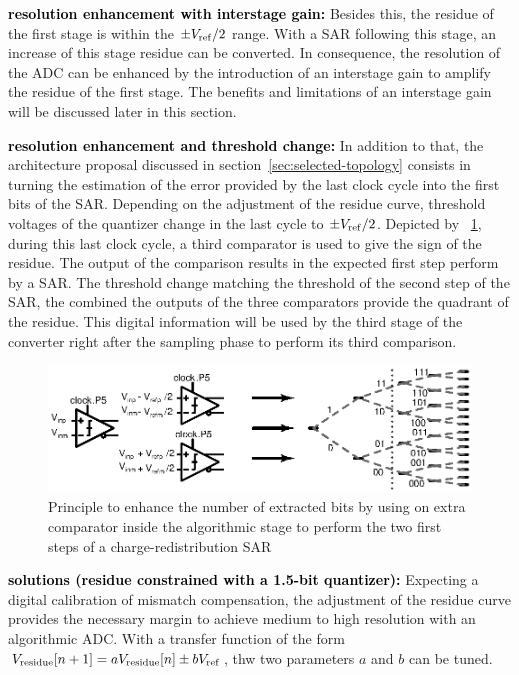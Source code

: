 \textbf{\textcolor{black}{resolution enhancement with interstage gain:}}
Besides this, the residue of the first stage is within the $\pm V_{\rm ref}/2$ range. With a SAR following this stage, an increase of this stage residue can be converted. In consequence, the resolution of the ADC can be enhanced by the introduction of an interstage gain to amplify the residue of the first stage. The benefits and limitations of an interstage gain will be discussed later in this section.

\textbf{\textcolor{black}{resolution enhancement and threshold change:}}
In addition to that, the architecture proposal discussed in section~\ref{sec:selected-topology} consists in turning the estimation of the error provided by the last clock cycle into the first bits of the SAR. Depending on the adjustment of the residue curve, threshold voltages of the quantizer change in the last cycle to \(\pm V_{\rm ref}/2\). Depicted by \figurename~\ref{fig:sar-first-bits-from-algo}, during this last clock cycle, a third comparator is used to give the sign of the residue. The output of the comparison results in the expected first step perform by a SAR\@. The threshold change matching the threshold of the second step of the SAR, the combined the outputs of the three comparators provide the quadrant of the residue. This digital information will be used by the third stage of the converter right after the sampling phase to perform its third comparison.

\begin{figure}[htp]
	\centering
	\includegraphics[width=\textwidth]{Chapter4/Figs/algo_sar_first_bits.ps}
	\caption{Principle to enhance the number of extracted bits by using on extra comparator inside the algorithmic stage to perform the two first steps of a charge-redistribution SAR}
	\label{fig:sar-first-bits-from-algo}
\end{figure}

\textbf{\textcolor{black}{solutions (residue constrained with a 1.5-bit quantizer):}}
Expecting a digital calibration of mismatch compensation, the adjustment of the residue curve provides the necessary margin to achieve medium to high resolution with an algorithmic ADC\@. With a transfer function of the form $V_{\rm residue}[n+1] = a V_{\rm residue}[n] \pm b V_{\rm ref}$, thw two parameters $a$ and $b$ can be tuned.

